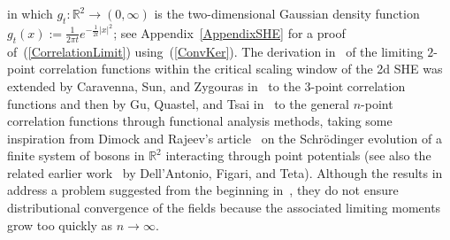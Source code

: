 \documentclass[10pt]{article}
\numberwithin{equation}{section}
\theoremstyle{definition}
\newcommand{\R}{{\mathbb R}}
\begin{document}
in which $g_t:\R^2\rightarrow (0,\infty)$ is the two-dimensional  Gaussian density function $g_t(x):=\frac{ 1  }{ 2\pi t } e^{-\frac{1}{2t}|x|^2}$; see Appendix~\ref{AppendixSHE} for a proof of~(\ref{CorrelationLimit}) using~(\ref{ConvKer}).   The derivation in~\cite{BC}  of the limiting $2$-point correlation functions within the critical scaling window of the 2d SHE was extended by  Caravenna, Sun, and Zygouras in~\cite{CSZ4} to the $3$-point correlation functions and then by  Gu, Quastel, and Tsai in~\cite{GQT} to the general $n$-point correlation functions  through functional analysis methods, taking some inspiration from Dimock and Rajeev's article~\cite{Dimock} on the Schr\"odinger evolution of a  finite system of bosons in $\R^2$ interacting through point potentials (see also the related earlier  work~\cite{Dell} by Dell'Antonio, Figari, and  Teta). Although the results in~\cite{GQT} address a problem  suggested from the beginning in~\cite[Remark on p.\ 620] {BC}, they do not ensure distributional convergence of the fields  because the associated limiting moments grow too quickly as $n\rightarrow \infty$.
\end{document}

